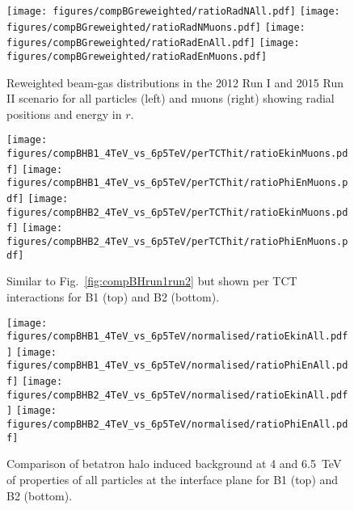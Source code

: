 \begin{figure}%
\centering
\texttt{[image: figures/compBGreweighted/ratioRadNAll.pdf]}
\texttt{[image: figures/compBGreweighted/ratioRadNMuons.pdf]}
\texttt{[image: figures/compBGreweighted/ratioRadEnAll.pdf]}
\texttt{[image: figures/compBGreweighted/ratioRadEnMuons.pdf]}
\caption{Reweighted beam-gas distributions in the 2012 Run I and 2015 Run II scenario for all particles (left) and muons (right) showing radial positions and energy in $r$.
  \label{fig:compBGreweighted2}}
\end{figure}



\begin{figure}
  \begin{center}
  \texttt{[image: figures/compBHB1\_4TeV\_vs\_6p5TeV/perTCThit/ratioEkinMuons.pdf]}
  \texttt{[image: figures/compBHB1\_4TeV\_vs\_6p5TeV/perTCThit/ratioPhiEnMuons.pdf]}
  \texttt{[image: figures/compBHB2\_4TeV\_vs\_6p5TeV/perTCThit/ratioEkinMuons.pdf]}
  \texttt{[image: figures/compBHB2\_4TeV\_vs\_6p5TeV/perTCThit/ratioPhiEnMuons.pdf]}
\end{center}
\vspace{-0.6cm}
 \caption{Similar to Fig.~\ref{fig:compBHrun1run2} but shown per TCT interactions for B1 (top) and B2 (bottom).
  \label{fig:compBHrun1run2PerTCT}}
\end{figure}



\begin{figure}%
\begin{center}
  \texttt{[image: figures/compBHB1\_4TeV\_vs\_6p5TeV/normalised/ratioEkinAll.pdf]}
  \texttt{[image: figures/compBHB1\_4TeV\_vs\_6p5TeV/normalised/ratioPhiEnAll.pdf]}
  \texttt{[image: figures/compBHB2\_4TeV\_vs\_6p5TeV/normalised/ratioEkinAll.pdf]}
  \texttt{[image: figures/compBHB2\_4TeV\_vs\_6p5TeV/normalised/ratioPhiEnAll.pdf]}
\end{center}
\vspace{-0.6cm}
 \caption{Comparison of betatron halo induced background at 4 and 6.5~TeV of properties of all particles at the interface plane for B1 (top) and B2 (bottom).
  \label{compBHrun1run22}}
\end{figure}



